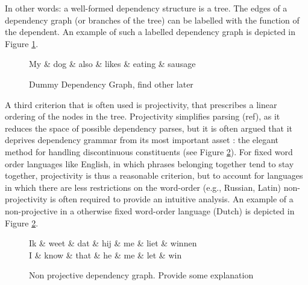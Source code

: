 \documentclass{report}
\theoremstyle{definition}
\theoremstyle{plain}
\begin{document}
In other words: a well-formed dependency structure is a tree. The edges of a dependency graph (or branches of the tree) can be labelled with the function of the dependent. An example of such a labelled dependency graph is depicted in Figure \ref{fig:depgraph}.

\begin{figure}[!ht]
\centering
\begin{dependency}[theme=simple]%
\begin{deptext}[column sep=.5cm, row sep=.1ex]
My \& dog \& also \& likes \& eating \& sausage \\
\end{deptext}
\end{dependency}
\caption{Dummy Dependency Graph, find other later}\label{fig:depgraph}
\end{figure}

A third criterion that is often used is projectivity, that prescribes a linear ordering of the nodes in the tree. Projectivity simplifies parsing (ref), as it reduces the space of possible dependency parses, but it is often argued that it deprives dependency grammar from its most important asset \citep{covington1990dependency,debusmann2000introduction}: the elegant method for handling discontinuous constituents (see Figure \ref{fig:npdeptree}). For fixed word order languages like English, in which phrases belonging together tend to stay together, projectivity is thus a reasonable criterion, but to account for languages in which there are less restrictions on the word-order (e.g., Russian, Latin) non-projectivity is often required to provide an intuitive analysis. An example of a non-projective in a otherwise fixed word-order language (Dutch) is depicted in Figure \ref{fig:npdeptree}.

\begin{figure}[!ht]
\centering
\begin{dependency}[theme=simple]%
\begin{deptext}[column sep=.5cm, row sep=.1ex]
Ik \& weet \& dat \& hij \& me \& liet \& winnen\\
\tiny{I} \& \tiny{know} \& \tiny{that} \& \tiny{he} \& \tiny{me} \& \tiny{let} \& \tiny{win}\\
\end{deptext}
\end{dependency}
\caption{Non projective dependency graph. Provide some explanation}\label{fig:npdeptree}
\end{figure}
\end{document}
